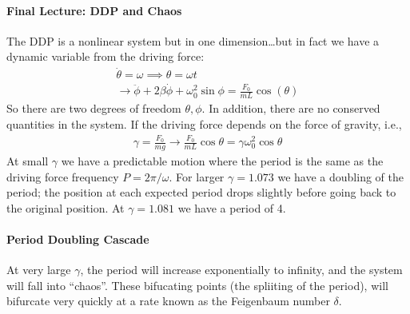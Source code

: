 \documentclass[../main.tex]{subfiles}
\begin{document}
\newpage
\paragraph*{Final Lecture: DDP and Chaos}
The DDP is a nonlinear system but in one dimension\dots but in fact we have a dynamic
variable from the driving force:
\begin{align*}
    \dot\theta = \omega \implies \theta = \omega t \\
    \to 
    \ddot \phi + 2\beta \dot\phi + \omega_0^2 \sin\phi = \frac{F_0}{mL} \cos(\theta)
\end{align*}
So there are two degrees of freedom $\theta, \phi$. In addition, there are no conserved quantities
in the system. If the driving force depends on the force of gravity, i.e., 
\begin{align*}
    \gamma = \frac{F_0}{mg} \to \frac{F_0}{mL} \cos\theta = \gamma \omega_0^2 \cos\theta
\end{align*}
At small $\gamma$ we have a predictable motion where the period is the same as the driving force
frequency $P = 2\pi/\omega$. For larger $\gamma = 1.073$ we have a doubling of the period;
the position at each expected period drops slightly before going back to the original position.
At $\gamma = 1.081$ we have a period of 4. 
\paragraph*{Period Doubling Cascade}
At very large $\gamma$, the period will increase exponentially to infinity, and the system will fall
into ``chaos''. These bifucating points (the spliiting of the period), 
will bifurcate very quickly at a rate known as the Feigenbaum number $\delta$.
\end{document}
